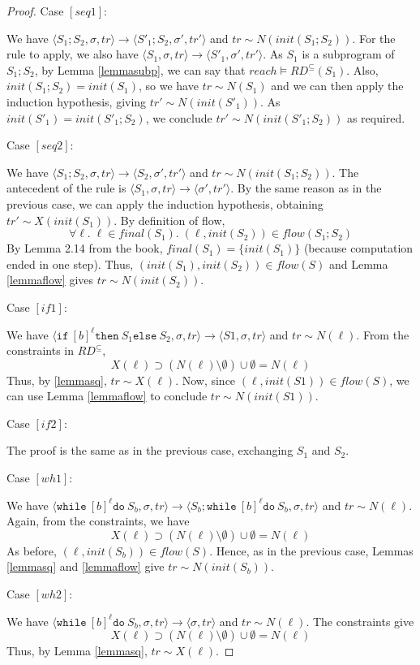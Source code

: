 \documentclass[a4wide,12pt]{article}
\theoremstyle{definition}
\theoremstyle{plain}
\theoremstyle{remark}
\def\const#1{\mathopen{\langle}#1\mathclose{\rangle}} %
\def\pair#1{\const{#1}}
\def\whilel{\texttt{while}\ }
\def\dol {\texttt{do}\ }
\def\ifl {\texttt{if}\ }
\def\thenl {\texttt{then}\ }
\def\elsel {\texttt{else}\ }
\begin{document}
\begin{proof}
Case $[seq1]$:

We have $\pair{S_1;S_2,\sigma,tr} \to \pair{S'_1;S_2,\sigma',tr'}$ and $tr \sim N(init(S_1;S_2))$.
For the rule to apply, we also have $\pair{S_1,\sigma,tr} \to \pair{S'_1,\sigma',tr'}$.
As $S_1$ is a subprogram of $S_1;S_2$, by Lemma \ref{lemmasubp},
we can say that $reach \models RD^{\subseteq}(S_1)$. Also, $init(S_1;S_2) = init(S_1)$, so we have
$tr \sim N(S_1)$ and we can then apply the induction hypothesis, giving $tr' \sim  N(init(S'_1))$.
As $init(S'_1) = init(S'_1;S_2)$, we conclude $tr' \sim N(init(S'_1;S_2))$ as required.

Case $[seq2]$:

We have $\pair{S_1;S_2,\sigma,tr} \to \pair{S_2,\sigma',tr'}$ and $tr \sim N(init(S_1;S_2))$.
The antecedent of the rule is $\pair{S_1,\sigma,tr} \to \pair{\sigma',tr'}$.
By the same reason as in the previous case, we can apply the induction hypothesis, obtaining
$tr' \sim X(init(S_1))$. By definition of flow, \[\forall \ell . \; \ell \in final(S_1). \;(\ell,init(S_2)) \in flow(S_1;S_2)\]
By Lemma 2.14 from the book, $final(S_1) = \{init(S_1)\}$ (because computation ended in one step). Thus,
$(init(S_1),init(S_2)) \in flow(S)$ and Lemma \ref{lemmaflow} gives $tr \sim N(init(S_2))$.

Case $[if1]$:

We have $\pair{\ifl [b]^\ell \thenl S_1 \elsel S_2,\sigma,tr} \to \pair{S1,\sigma,tr}$ and $tr \sim N(\ell)$.
From the constraints in $RD^{\subseteq}$, 
\[ X(\ell) \supset (N(\ell) \setminus \emptyset) \cup \emptyset = N(\ell)\]
Thus, by \ref{lemmasq}, $tr \sim X(\ell)$. Now, since $(\ell,init(S1)) \in flow(S)$, we can use Lemma \ref{lemmaflow}
to conclude $tr \sim N(init(S1))$.

Case $[if2]$:

The proof is the same as in the previous case, exchanging $S_1$ and $S_2$.

Case $[wh1]$:

We have $\pair{\whilel [b]^\ell \dol S_b,\sigma,tr} \to \pair{S_b;\whilel [b]^\ell \dol S_b,\sigma,tr}$ and $tr \sim N(\ell)$.
Again, from the constraints, we have
\[X(\ell) \supset (N(\ell) \setminus \emptyset) \cup \emptyset = N(\ell)\]
As before, $(\ell,init(S_b)) \in flow(S)$. Hence, as in the previous case, Lemmas \ref{lemmasq} and \ref{lemmaflow} give
$tr \sim N(init(S_b))$.

Case $[wh2]$:

We have $\pair{\whilel [b]^\ell \dol S_b,\sigma,tr} \to \pair{\sigma,tr}$ and $tr \sim N(\ell)$.
The constraints give
\[X(\ell) \supset (N(\ell) \setminus \emptyset) \cup \emptyset = N(\ell)\]
Thus, by Lemma \ref{lemmasq}, $tr \sim X(\ell)$.

\end{proof}
\end{document}
